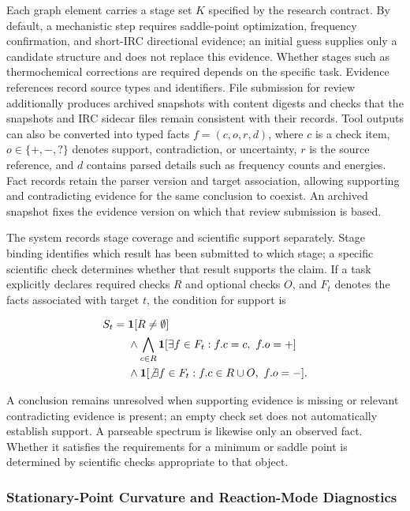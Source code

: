 Each graph element carries a stage set $K$ specified by the research contract. By default, a mechanistic step requires saddle-point optimization, frequency confirmation, and short-IRC directional evidence; an initial guess supplies only a candidate structure and does not replace this evidence. Whether stages such as thermochemical corrections are required depends on the specific task. Evidence references record source types and identifiers. File submission for review additionally produces archived snapshots with content digests and checks that the snapshots and IRC sidecar files remain consistent with their records. Tool outputs can also be converted into typed facts $f=(c,o,r,d)$, where $c$ is a check item, $o\in\{+,-,?\}$ denotes support, contradiction, or uncertainty, $r$ is the source reference, and $d$ contains parsed details such as frequency counts and energies. Fact records retain the parser version and target association, allowing supporting and contradicting evidence for the same conclusion to coexist. An archived snapshot fixes the evidence version on which that review submission is based.

The system records stage coverage and scientific support separately. Stage binding identifies which result has been submitted to which stage; a specific scientific check determines whether that result supports the claim. If a task explicitly declares required checks $R$ and optional checks $O$, and $F_t$ denotes the facts associated with target $t$, the condition for support is

\begin{equation}\label{eq:methods-9}
\begin{aligned}
S_t={}&\mathbf 1[R\ne\emptyset]\\
&\land\bigwedge_{c\in R}\mathbf 1[\exists f\in F_t:f.c=c,\ f.o=+]\\
&\land\mathbf 1[\not\exists f\in F_t:f.c\in R\cup O,\ f.o=-].
\end{aligned}
\end{equation}

A conclusion remains unresolved when supporting evidence is missing or relevant contradicting evidence is present; an empty check set does not automatically establish support. A parseable spectrum is likewise only an observed fact. Whether it satisfies the requirements for a minimum or saddle point is determined by scientific checks appropriate to that object.

\subsubsection{Stationary-Point Curvature and Reaction-Mode Diagnostics}

